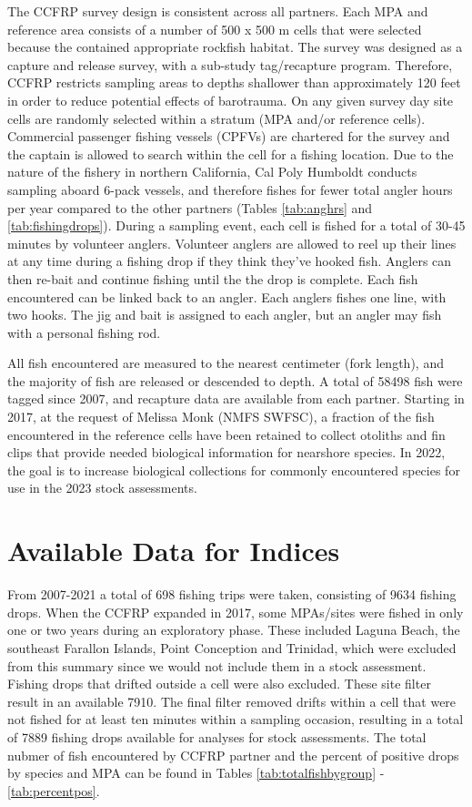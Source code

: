 \documentclass[
]{article}
\begin{document}
The CCFRP survey design is consistent across all partners. Each MPA and reference
area consists of a number of 500 x 500 m cells that were selected because the contained
appropriate rockfish habitat. The survey was designed as a capture
and release survey, with a sub-study tag/recapture program. Therefore, CCFRP restricts
sampling areas to depths shallower than approximately 120 feet in order to reduce
potential effects of barotrauma. On any given survey
day site cells are randomly selected within a stratum (MPA and/or reference cells).
Commercial passenger fishing vessels (CPFVs) are chartered for the survey and
the captain is allowed to search within the cell for a fishing location.
Due to the nature of the fishery in northern California, Cal Poly Humboldt conducts
sampling aboard 6-pack vessels, and therefore fishes for fewer total angler hours per
year compared to the other partners (Tables \ref{tab:anghrs} and \ref{tab:fishingdrops}). During
a sampling event, each cell is fished for a total of 30-45 minutes by volunteer
anglers. Volunteer anglers are allowed to reel up their lines at any time during a
fishing drop if they think they've hooked fish. Anglers can then re-bait and
continue fishing until the the drop is complete. Each fish encountered
can be linked back to an angler. Each anglers fishes one line, with two hooks.
The jig and bait is assigned to each angler, but an angler may fish with a personal
fishing rod.

All fish encountered are measured to the nearest centimeter (fork length), and the
majority of fish are released or descended to depth.
A total of 58498 fish were tagged
since 2007, and recapture data are available from each partner. Starting in 2017,
at the request of Melissa Monk (NMFS SWFSC), a fraction of the fish encountered
in the reference cells have been retained to collect otoliths and fin clips that
provide needed biological information for nearshore species. In 2022, the goal
is to increase biological collections for commonly encountered species for use
in the 2023 stock assessments.

\hypertarget{available-data-for-indices}{%
\section{Available Data for Indices}\label{available-data-for-indices}}

From 2007-2021 a total of 698 fishing trips
were taken, consisting of 9634 fishing drops. When the CCFRP
expanded in 2017, some MPAs/sites were fished in only one or two years during an
exploratory phase. These included Laguna Beach, the southeast Farallon Islands,
Point Conception and Trinidad, which were excluded from this summary since we
would not include them in a stock assessment.
Fishing drops that drifted outside a cell were also excluded. These site filter
result in an available 7910. The final filter removed
drifts within a cell that were not fished for at least ten minutes within a sampling
occasion, resulting in a total of 7889 fishing
drops available for analyses for stock assessments. The total nubmer of fish
encountered by CCFRP partner and the percent of positive drops by species and MPA
can be found in Tables \ref{tab:totalfishbygroup} - \ref{tab:percentpos}.
\end{document}

